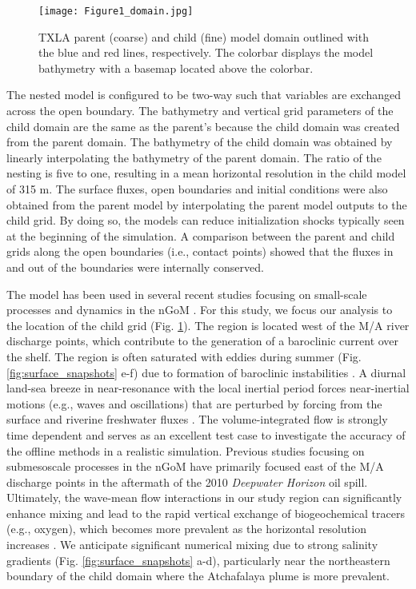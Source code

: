 \documentclass[draft]{agujournal2019}
\begin{document}
\begin{figure}[ht] 
 \centerline{\texttt{[image: Figure1\_domain.jpg]}}
  \caption{TXLA parent (coarse) and child (fine) model domain outlined with the blue and red lines, respectively. The colorbar displays the model bathymetry with a basemap located above the colorbar.}
  \label{fig:domain_overview}
\end{figure}

The nested model is configured to be two-way such that variables are exchanged across the open boundary. The bathymetry and vertical grid parameters of the child domain are the same as the parent's because the child domain was created from the parent domain. The bathymetry of the child domain was obtained by linearly interpolating the bathymetry of the parent domain. The ratio of the nesting is five to one, resulting in a mean horizontal resolution in the child model of 315 m. The surface fluxes, open boundaries and initial conditions were also obtained from the parent model by interpolating the parent model outputs to the child grid. By doing so, the models can reduce initialization shocks typically seen at the beginning of the simulation. A comparison between the parent and child grids along the open boundaries (i.e., contact points) showed that the fluxes in and out of the boundaries were internally conserved. 

The model has been used in several recent studies focusing on small-scale processes and dynamics in the nGoM \cite{Kobashi_2020,Qu_2021, Qu_2022_NIW, qu2022rapid, Xomchuk_2020}. For this study, we focus our analysis to the location of the child grid (Fig. \ref{fig:domain_overview}). The region is located west of the M/A river discharge points, which contribute to the generation of a baroclinic current over the shelf. The region is often saturated with eddies during summer (Fig. \ref{fig:surface_snapshots} e-f) due to formation of baroclinic instabilities \cite{Hetland_2017,Zhang_2012_numerical}. A diurnal land-sea breeze in near-resonance with the local inertial period forces near-inertial motions (e.g., waves and oscillations) that are perturbed by forcing from the surface and riverine freshwater fluxes \cite{zhang2009near}. The volume-integrated flow is strongly time dependent and serves as an excellent test case to investigate the accuracy of the offline methods in a realistic simulation. Previous studies focusing on submesoscale processes in the nGoM \cite{Barkan_2017,Luo_2016} have primarily focused east of the M/A discharge points in the aftermath of the 2010 \textit{Deepwater Horizon} oil spill. Ultimately, the wave-mean flow interactions in our study region can significantly enhance mixing and lead to the rapid vertical exchange of biogeochemical tracers (e.g., oxygen), which becomes more prevalent as the horizontal resolution increases \cite{qu2022rapid}. We anticipate significant numerical mixing due to strong salinity gradients (Fig. \ref{fig:surface_snapshots} a-d), particularly near the northeastern boundary of the child domain where the Atchafalaya plume is more prevalent. 
\end{document}
